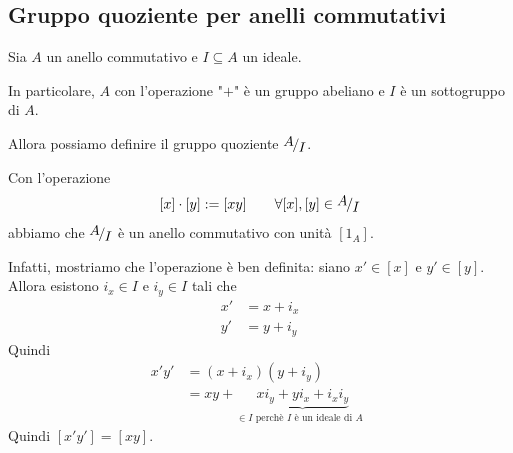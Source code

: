 \documentclass[../main.tex]{subfiles}
\begin{document}
\subsection{Gruppo quoziente per anelli commutativi}

Sia $A$ un anello commutativo e $I \subseteq A$ un ideale.

In particolare, $A$ con l'operazione "$+$" è un gruppo abeliano e $I$ è un sottogruppo di $A$.

Allora possiamo definire il gruppo quoziente $\nicefrac{A}{I}$.

Con l'operazione
\[
    [x] \cdot [y] := [xy] \qquad \forall [x] , [y] \in \nicefrac{A}{I}
\]
abbiamo che $\nicefrac{A}{I}$ è un anello commutativo con unità $[1_A]$.

Infatti, mostriamo che l'operazione è ben definita: siano $x' \in [x]$ e $y' \in [y]$. Allora esistono $i_x \in I$ e $i_y \in I$ tali che
\begin{align*}
    x' & = x + i_x \\
    y' & = y + i_y
\end{align*}
Quindi
\begin{align*}
    x'y' & = (x + i_x) (y + i_y)                                                                      \\
         & = xy + \underbrace{x i_y + y i_x + i_x i_y}_{\in I \text{ perchè $I$ è un ideale di $A$ }}
\end{align*}
Quindi $[x'y'] = [xy]$.
\end{document}
